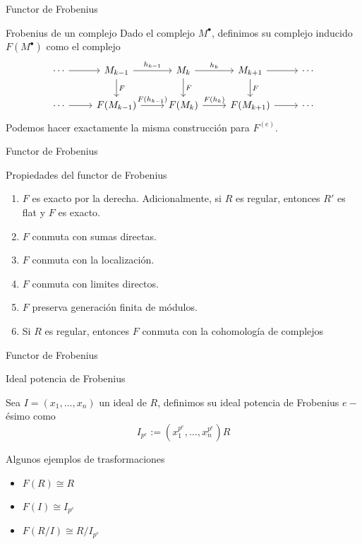 \documentclass{beamer}
\begin{document}
\begin{frame}[fragile]{Functor de Frobenius}
\begin{block}{Frobenius de un complejo}
  Dado el complejo $M^{\bullet}$, definimos su complejo inducido $F(M^{\bullet})$ como el complejo 
\[\begin{tikzcd}
	\cdots & {M_{k-1}} & {M_{k}} & {M_{k+1}} & \cdots \\
	\cdots & {F(M_{k-1})} & {F(M_{k})} & {F(M_{k+1})} & \cdots
	\arrow["F", from=1-2, to=2-2]
	\arrow["F", from=1-3, to=2-3]
	\arrow["F", from=1-4, to=2-4]
	\arrow["{h_{k-1}}", from=1-2, to=1-3]
	\arrow["{h_k}", from=1-3, to=1-4]
	\arrow["{F(h_{k-1})}", from=2-2, to=2-3]
	\arrow["{F(h_k)}", from=2-3, to=2-4]
	\arrow[from=1-1, to=1-2]
	\arrow[from=1-4, to=1-5]
	\arrow[from=2-4, to=2-5]
	\arrow[from=2-1, to=2-2]
\end{tikzcd}\]
Podemos hacer exactamente la misma construcción para $F ^{(e)}$.
\end{block}
\end{frame}



\begin{frame}[fragile]{Functor de Frobenius}
\begin{block}{Propiedades del functor de Frobenius}
\begin{enumerate}
  \item $F$ es exacto por la derecha. Adicionalmente, si  $R$ es regular, entonces  $R'$ es flat y  $F$ es exacto.
  \item $F$ conmuta con sumas directas.
  \item $F$ conmuta con la localización.
  \item  $F$ conmuta con limites directos.
  \item  $F$ preserva generación finita de módulos.
  \item  Si $R$ es regular, entonces $F$ conmuta con la cohomología de complejos
\end{enumerate}
\end{block}
\end{frame}



\begin{frame}[fragile]{Functor de Frobenius}
\begin{block}{Ideal potencia de Frobenius}
 
  Sea $I = (x_1, \ldots, x_n)$ un ideal de $R$, definimos su ideal potencia de Frobenius $e-$ésimo como
   \[
	 I _{p^e} := (x_1^{p^e}, \ldots, x_n ^{p^e})R
  \] 
\end{block}
\begin{block}{Algunos ejemplos de trasformaciones}
  \begin{itemize}
	\item $F(R)\cong R$
	\item $F(I) \cong I_{p^e}$
	\item $F(R / I)\cong R / I_{p^e}$
  \end{itemize}
\end{block}
\end{frame}
\end{document}
